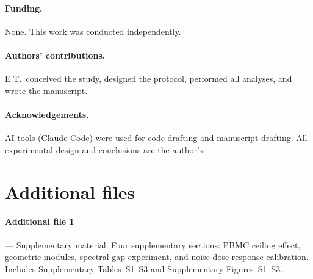 \documentclass[11pt]{article}
\begin{document}
\paragraph{Funding.} None. This work was conducted independently.

\paragraph{Authors' contributions.} E.T.\ conceived the study,
designed the protocol, performed all analyses, and wrote the
manuscript.

\paragraph{Acknowledgements.} AI tools (Claude Code) were used for code
drafting and manuscript drafting. All experimental design and conclusions
are the author's.


\section*{Additional files}

\paragraph{Additional file 1} --- Supplementary material.
Four supplementary sections: PBMC ceiling effect, geometric modules,
spectral-gap experiment, and noise dose-response calibration.
Includes Supplementary Tables~S1--S3 and Supplementary Figures~S1--S3.






\end{document}
